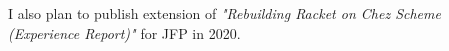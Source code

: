 
I also plan to publish extension of \emph{"Rebuilding Racket on Chez
  Scheme (Experience Report)"} \cite{racket-on-chez-19} for JFP in 2020.

\vspace{-0.25cm}
